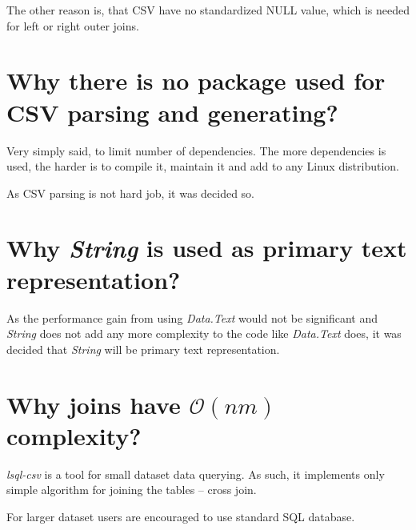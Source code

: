 The other reason is, that CSV have no standardized NULL value, which is needed for left or right outer joins.

\section{Why there is no package used for CSV parsing and generating?}
Very simply said, to limit number of dependencies. The more dependencies is used, the harder is to compile it, maintain it and add to any Linux distribution.

As CSV parsing is not hard job, it was decided so.

\section{Why \textit{String} is used as primary text representation?}
As the performance gain from using \textit{Data.Text} would not be significant and \textit{String} does not add any more complexity to the code like \textit{Data.Text} does, 
it was decided that \textit{String} will be primary text representation.

\section{Why joins have $\mathcal{O}(nm)$ complexity?}
\textit{lsql-csv} is a tool for small dataset data querying. As such, it implements only simple algorithm for joining the tables -- cross join.

For larger dataset users are encouraged to use standard SQL database.


